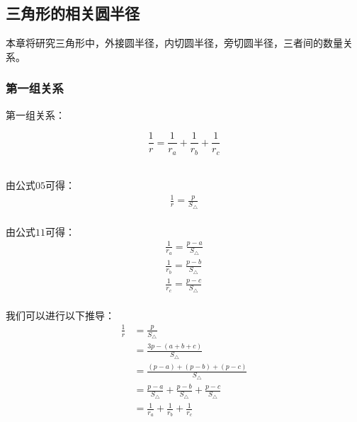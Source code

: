 \documentclass[UTF8]{ctexart}
\begin{document}
\newpage

\subsection{三角形的相关圆半径}
    本章将研究三角形中，外接圆半径，内切圆半径，旁切圆半径，三者间的数量关系。

\subsubsection{第一组关系}
    第一组关系：
    \begin{large}
        \begin{equation*}
            \frac{1}{r}=\frac{1}{r_a}+\frac{1}{r_b}+\frac{1}{r_c}
        \end{equation*}
    \end{large}\\
    由公式$05$可得：
    \setcounter{equation}{0}
    \begin{align}
        \frac{1}{r}=\frac{p}{S_{\triangle}}
    \end{align}\\
    由公式$11$可得：
    \begin{align}
        \frac{1}{r_a}=\frac{p-a}{S_{\triangle}}\\[3mm]
        \frac{1}{r_b}=\frac{p-b}{S_{\triangle}}\\[3mm]
        \frac{1}{r_c}=\frac{p-c}{S_{\triangle}}
    \end{align}\\
    我们可以进行以下推导：
    \begin{align}
        \frac{1}{r}
        &=\frac{p}{S_{\triangle}}\\[3mm]
        &=\frac{3p-(a+b+c)}{S_{\triangle}}\\[3mm]
        &=\frac{(p-a)+(p-b)+(p-c)}{S_{\triangle}}\\[3mm]
        &=\frac{p-a}{S_{\triangle}}+\frac{p-b}{S_{\triangle}}+\frac{p-c}{S_{\triangle}}\\[3mm]
        &=\frac{1}{r_a}+\frac{1}{r_b}+\frac{1}{r_c}
    \end{align}
\end{document}
